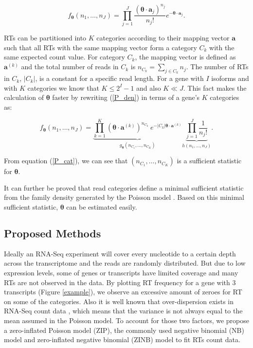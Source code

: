\documentclass[11pt]{article}
\begin{document}
\begin{equation}
f_{\boldsymbol{\theta}}(n_1,\ldots,n_J)=\prod_{j=1}^{J}\frac{(\boldsymbol{\theta}\cdot\mathbf{a}_j)^{n_j}}{n_j!}e^{-\boldsymbol{\theta}\cdot\mathbf{a}_j}.
\label{P_den}
\end{equation}

\noindent RTs can be partitioned into $K$ categories according to their mapping vector $\mathbf{a}$ such that all RTs with the same mapping vector form a category $C_k$ with the same expected count value. For category $C_k$, the mapping vector is defined as $\mathbf{a}^{(k)}$ and the total number of reads in $C_k$ is $n_{C_k}=\sum_{j\in C_k}n_j$. The number of RTs in $C_k$, $|C_k|$, is a constant for a specific read length. For a gene with $I$ isoforms and with $K$ categories we know that $K\leq2^I-1$ and also $K\ll J$.  This fact makes the calculation of $\boldsymbol{\theta}$ faster by rewriting (\ref{P_den}) in terms of a gene's $K$ categories as:

\begin{equation}
\label{P_cat}
f_{\boldsymbol{\theta}}(n_1,\ldots,n_J)=\underbrace{\prod_{k=1}^K{(\boldsymbol{\theta}\cdot\mathbf{a}^{(k)})^{n_{C_k}}\ e^{-|C_k|\boldsymbol{\theta}\cdot\mathbf{a}^{(k)}}}}_{g_{\boldsymbol{\theta}}(n_{C_1},\ldots,n_{C_K})}\underbrace{\prod_{j=1}^{J}\frac{1}{n_j!}}_{h(n_1,\ldots,n_J)}.
\end{equation}

From equation (\ref{P_cat}), we can see that $(n_{C_1},\ldots,n_{C_K})$ is a sufficient statistic for $\boldsymbol{\theta}$. 
 
It can further be proved that read categories define a minimal sufficient statistic from the family density generated by the Poisson model \cite{salzman2011statistical}. Based on this minimal sufficient statistic, $\boldsymbol{\theta}$ can be estimated easily.

\subsection{Proposed Methods}
\label{proposed}

Ideally an RNA-Seq experiment will cover every nucleotide to a certain depth across the transcriptome and the reads are randomly distributed.  But due to low expression levels, some of genes or transcripts have limited coverage and many RTs are not observed in the data.  By plotting RT  frequency for a gene with $3$ transcripts (Figure \ref{example}), we observe an excessive amount of zeroes for RT on some of the categories.  Also it is well known that over-dispersion exists in RNA-Seq count data \cite{anders2010differential}, which means that the variance is not always equal to the mean assumed in the Poisson model.  To account for those two factors, we propose a zero-inflated Poisson model (ZIP), the commonly used negative binomial (NB) model and zero-inflated negative binomial (ZINB) model to fit RTs count data.
\end{document}
